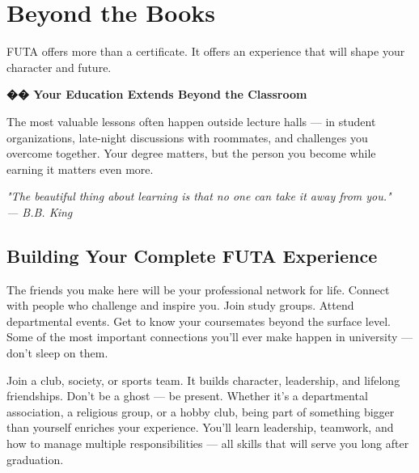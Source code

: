 \documentclass[11pt,a4paper]{article}
\newcommand{\quotetext}[1]{\begin{quotebox}\itshape\color{primary}#1\end{quotebox}}
\begin{document}
\newpage
\section{Beyond the Books}

FUTA offers more than a certificate. It offers an experience that will shape your character and future.

\begin{inspirational}
    \textbf{\color{primary}\Large �� Your Education Extends Beyond the Classroom}

    \vspace{0.5em}

    The most valuable lessons often happen outside lecture halls --- in student organizations, late-night discussions with roommates, and challenges you overcome together. Your degree matters, but the person you become while earning it matters even more.

    \vspace{0.5em}

    \quotetext{"The beautiful thing about learning is that no one can take it away from you." \\ --- B.B. King}
\end{inspirational}

\subsection{Building Your Complete FUTA Experience}

\begin{tcolorbox}[colback=lightGray,colframe=primary,title={\color{white}\textbf{Network Intentionally}},colbacktitle=primary,arc=4pt,breakable]
The friends you make here will be your professional network for life. Connect with people who challenge and inspire you. Join study groups. Attend departmental events. Get to know your coursemates beyond the surface level. Some of the most important connections you'll ever make happen in university --- don't sleep on them.
\end{tcolorbox}

\begin{tcolorbox}[colback=lightGray,colframe=primary,title={\color{white}\textbf{Get Involved}},colbacktitle=primary,arc=4pt,breakable]
Join a club, society, or sports team. It builds character, leadership, and lifelong friendships. Don't be a ghost --- be present. Whether it's a departmental association, a religious group, or a hobby club, being part of something bigger than yourself enriches your experience. You'll learn leadership, teamwork, and how to manage multiple responsibilities --- all skills that will serve you long after graduation.
\end{tcolorbox}
\end{document}
